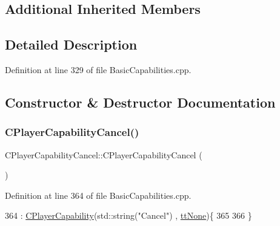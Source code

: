 \subsection*{Additional Inherited Members}


\subsection{Detailed Description}


Definition at line 329 of file Basic\+Capabilities.\+cpp.



\subsection{Constructor \& Destructor Documentation}
\hypertarget{classCPlayerCapabilityCancel_a7e3ac034b99b436032fdd2059d2fb727}{}\label{classCPlayerCapabilityCancel_a7e3ac034b99b436032fdd2059d2fb727} 
\subsubsection{\texorpdfstring{C\+Player\+Capability\+Cancel()}{CPlayerCapabilityCancel()}}
{\footnotesize\ttfamily C\+Player\+Capability\+Cancel\+::\+C\+Player\+Capability\+Cancel (\begin{DoxyParamCaption}{ }\end{DoxyParamCaption})\hspace{0.3cm}{\ttfamily [protected]}}



Definition at line 364 of file Basic\+Capabilities.\+cpp.


\begin{DoxyCode}
364                                                  : \hyperlink{classCPlayerCapability_a303de62aba5d3f65d9a8e013c64a96c1}{CPlayerCapability}(std::string(\textcolor{stringliteral}{"Cancel"})
      , \hyperlink{classCPlayerCapability_a9d3450ed1532fd536bd6cbb1e2eef02fac78f0e806a6b0ead030d63c27c9ce929}{ttNone})\{
365 
366 \}
\end{DoxyCode}
\hypertarget{classCPlayerCapabilityCancel_a354db8bd423b9bf6959de288177db049}{}\label{classCPlayerCapabilityCancel_a354db8bd423b9bf6959de288177db049} 
